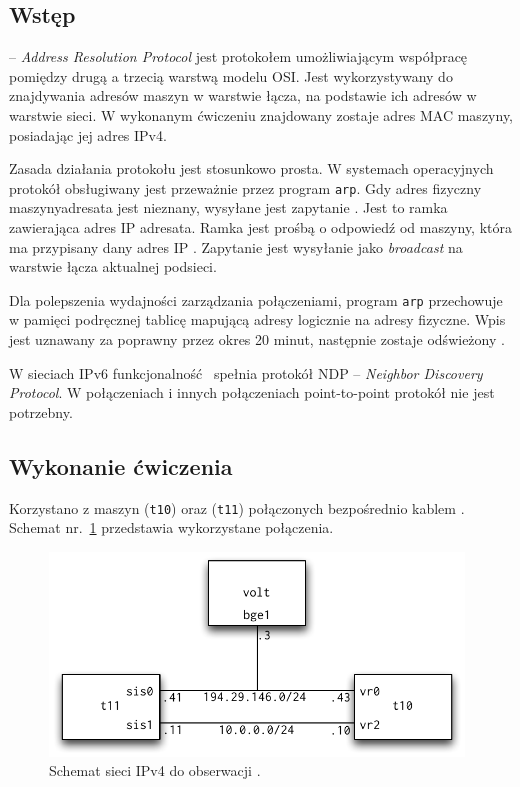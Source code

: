 \subsection{Wstęp}

\arp{} -- \emph{Address Resolution Protocol} jest protokołem umożliwiającym
współpracę pomiędzy drugą a trzecią warstwą modelu OSI. Jest wykorzystywany do
znajdywania adresów maszyn w warstwie łącza, na podstawie ich adresów w warstwie
sieci. W wykonanym ćwiczeniu znajdowany zostaje adres MAC maszyny, posiadając
jej adres IPv4.

Zasada działania protokołu \arp{} jest stosunkowo prosta. W systemach
operacyjnych protokół obsługiwany jest przeważnie przez program \texttt{arp}.
Gdy adres fizyczny maszyny\dywiz adresata jest nieznany, wysyłane jest zapytanie
\arp. Jest to ramka \eth{} zawierająca adres IP adresata. Ramka jest prośbą o
odpowiedź od maszyny, która ma przypisany dany adres IP
\cite{arp:stevens_arp_przyklad}. Zapytanie jest wysyłanie jako \emph{broadcast}
na warstwie łącza aktualnej podsieci.

Dla polepszenia wydajności zarządzania połączeniami, program \texttt{arp}
przechowuje w pamięci podręcznej tablicę mapującą adresy logicznie na adresy
fizyczne. Wpis jest uznawany za poprawny przez okres 20 minut, następnie zostaje
odświeżony \cite{arp:stevens_arp_cache}.

W sieciach IPv6 funkcjonalność \arp{} spełnia protokół NDP -- \emph{Neighbor
Discovery Protocol}. W połączeniach \ppp{} i innych połączeniach point-to-point
protokół \arp{} nie jest potrzebny.

\subsection{Wykonanie ćwiczenia}

Korzystano z maszyn \tjz{} (\texttt{t10}) oraz \tjj{} (\texttt{t11}) połączonych
bezpośrednio kablem \eth. Schemat nr.~\ref{fig:arp:schemat-po-konfiguracji}
przedstawia wykorzystane połączenia.

\begin{figure}[h!]
  \centering
  \includegraphics[width=11cm]{figury/arp/schemat-po-konfiguracji.pdf}
  \caption{Schemat sieci IPv4 do obserwacji \arp.}
  \label{fig:arp:schemat-po-konfiguracji}
\end{figure}

